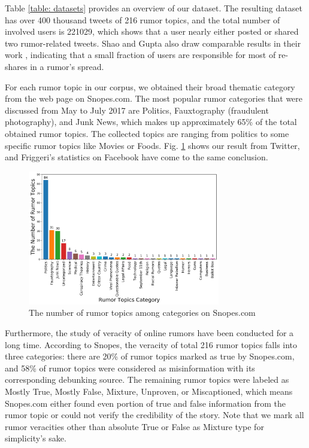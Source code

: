 \documentclass[conference]{IEEEtran}
\begin{document}
	Table \ref{table: datasets} provides an overview of our dataset. The resulting dataset has over 400 thousand tweets of 216 rumor topics, and the total number of involved users is 221029, which shows that a user nearly either posted or shared two rumor-related tweets. Shao and Gupta also draw comparable results in their work \cite{shao2016hoaxy, gupta2013faking}, indicating that a small fraction of users are responsible for most of re-shares in a rumor's spread. 
	
	For each rumor topic in our corpus, we obtained their broad thematic category from the web page on Snopes.com. The most popular rumor categories that were discussed from May to July 2017 are Politics, Fauxtography (fraudulent photography), and Junk News, which makes up approximately 65\% of the total obtained rumor topics. The collected topics are ranging from politics to some specific rumor topics like Movies or Foods. Fig. \ref{fig:bar_1} shows our result from Twitter, and Friggeri's \cite{friggeri2014rumor} statistics on Facebook have come to the same conclusion. 
	
	\begin{figure}[htbp]
		\centerline{\includegraphics[width=3.3in]{figures/figure_1.png}}
		\caption{The number of rumor topics among categories on Snopes.com}
		\label{fig:bar_1}
	\end{figure}
	
	Furthermore, the study of veracity of online rumors have been conducted for a long time. According to Snopes, the veracity of total 216 rumor topics falls into three categories: there are 20\% of rumor topics marked as true by Snopes.com, and 58\% of rumor topics were considered as misinformation with its corresponding debunking source. The remaining rumor topics were labeled as Mostly True, Mostly False, Mixture, Unproven, or Miscaptioned, which means Snopes.com either found even portion of true and false information from the rumor topic or could not verify the credibility of the story. Note that we mark all rumor veracities other than absolute True or False as Mixture type for simplicity's sake. 
	
\end{document}
